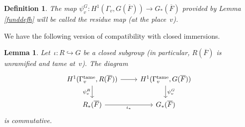 \documentclass[a4paper,english,12pt]{amsart}
\newcommand{\oF}{\overline F}
\DeclareMathOperator{\tame}{{tame}}
\newtheorem{mydef}[equation]{Definition}
\newtheorem{lem}[equation]{Lemma}
\numberwithin{equation}{subsection}
\begin{document}
\begin{mydef}
The map $\psi^G_v:H^1(\Gamma_v, G(\oF))\to G_*(\oF)$ provided by Lemma \ref{funddefh} will be called the residue map (at the place~$v$).
\end{mydef}
We have the following version of compatibility with closed immersions.
\begin{lem}\label{residueandsubgroup}
Let~$\iota:R\hookrightarrow G$ be a closed subgroup (in particular, $R(\oF)$ is unramified and tame at~$v$). The diagram
\[\begin{tikzcd}
	{H^1(\Gamma^{\tame}_v,R(\oF))} & {H^1(\Gamma^{\tame}_v, G(\oF))} \\
	{R_*(\oF)} & {G_*(\oF)}
	\arrow[from=1-1, to=1-2]
	\arrow["{\psi^R_v}"', from=1-1, to=2-1]
	\arrow["{\iota_*}"', from=2-1, to=2-2]
	\arrow["{\psi^G_v}", from=1-2, to=2-2]
\end{tikzcd}\]
is commutative.
\end{lem}
\end{document}
